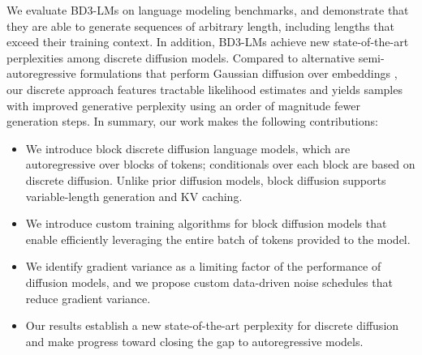 \documentclass{article} %
\def\algofull{Block Discrete Denoising Diffusion Language Models}
\def\algos{BD3-LMs}
\begin{document}
We evaluate \algos{} on language modeling benchmarks, and demonstrate that they are able to generate sequences of arbitrary length, including lengths that exceed their training context. In addition, \algos{} achieve new state-of-the-art perplexities among discrete diffusion models. %
Compared to alternative semi-autoregressive formulations that perform Gaussian diffusion over embeddings \citep{han2022ssd,han2023ssd2}, our discrete approach features tractable likelihood estimates and yields samples with improved generative perplexity using an order of magnitude fewer generation steps.
In summary, our work makes the following contributions:
\begin{itemize}
    \item We introduce block discrete diffusion language models, which are autoregressive over blocks of tokens; conditionals over each block are based on discrete diffusion. Unlike prior diffusion models, block diffusion supports variable-length generation and KV caching.
    \item  We introduce custom training algorithms for block diffusion models that enable efficiently leveraging the entire batch of tokens provided to the model.
    \item We identify gradient variance as a limiting factor of the performance of diffusion models, and we propose custom data-driven noise schedules that reduce gradient variance.
    \item Our results establish a new state-of-the-art perplexity for discrete diffusion and make progress toward closing the gap to autoregressive models.
\end{itemize}

\end{document}
